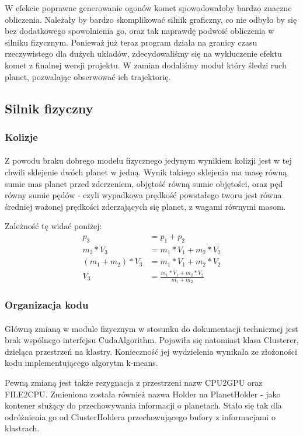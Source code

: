 W efekcie poprawne generowanie ogonów komet spowodowałoby bardzo znaczne obliczenia. Należały by bardzo skomplikować silnik graficzny, co nie odbyło by się bez dodatkowego spowolnienia go, oraz tak naprawdę podwoić obliczenia w silniku fizycznym. Ponieważ już teraz program działa na granicy czasu rzeczywistego dla dużych układów, zdecydowaliśmy się na wykluczenie efektu komet z finalnej wersji projektu. W zamian dodaliśmy moduł który śledzi ruch planet, pozwalając obserwować ich trajektorię.

\subsection{Silnik fizyczny}\label{sub:silnik fizyczny}
\subsubsection{Kolizje}
\paragraph{}

Z powodu braku dobrego modelu fizycznego jedynym wynikiem kolizji jest w tej chwili sklejenie dwóch planet w jedną. Wynik takiego sklejenia ma masę równą sumie mas planet przed zderzeniem, objętość równą sumie objętości, oraz pęd równy sumie pędów - czyli wypadkowa prędkość powstałego tworu jest równa średniej ważonej prędkości zderzających się planet, z wagami równymi masom.

Zależność tę widać poniżej:
\begin{align}
p_3 & = p_1 + p_2 \\
m_3 * V_3 & = m_1 * V_1 + m_2 * V_2 \\
( m_1 + m_2 ) * V_3 & = m_1 * V_1 + m_2 * V_2 \\
V_3 & = \frac{ m_1 * V_1 + m_2 * V_2 }{ m_1 + m_2 }
\end{align}

\subsubsection{Organizacja kodu}

\paragraph{}

Główną zmianą w module fizycznym w stosunku do dokumentacji technicznej jest brak wspólnego interfejsu CudaAlgorithm. Pojawiła się natomiast klasa Clusterer, dzieląca przestrzeń na klastry. Konieczność jej wydzielenia wynikała ze złożoności kodu implementującego algorytm k-means.

Pewną zmianą jest także rezygnacja z przestrzeni nazw CPU2GPU oraz FILE2CPU. Zmieniona została również nazwa Holder na PlanetHolder - jako kontener służący do przechowywania informacji o planetach. Stało się tak dla odróżnienia go od ClusterHoldera przechowującego bufory z informacjami o klastrach.



